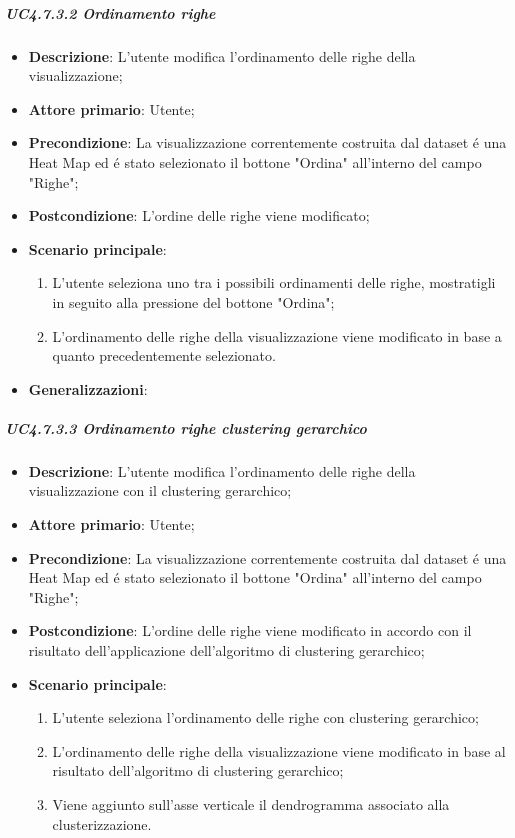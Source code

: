 \subparagraph{UC4.7.3.2 Ordinamento righe}
\label{spar:uc4.7.3.2}
\begin{itemize}
    \item \textbf{Descrizione}:     L'utente modifica l'ordinamento delle righe della visualizzazione;
    \item \textbf{Attore primario}: Utente;
    \item \textbf{Precondizione}:   La visualizzazione correntemente costruita dal dataset é una Heat Map ed é stato selezionato il bottone "Ordina" all'interno del campo "Righe";
    \item \textbf{Postcondizione}:  L'ordine delle righe viene modificato;
    \item \textbf{Scenario principale}:
    \begin{enumerate}
        \item L'utente seleziona uno tra i possibili ordinamenti delle righe, mostratigli in seguito alla pressione del bottone "Ordina";
        \item L'ordinamento delle righe della visualizzazione viene modificato in base a quanto precedentemente selezionato.
    \end{enumerate}
    \item \textbf{Generalizzazioni}:
\end{itemize}

\subparagraph{UC4.7.3.3 Ordinamento righe clustering gerarchico}
\label{spar:uc4.7.3.3}
\begin{itemize}
    \item \textbf{Descrizione}:     L'utente modifica l'ordinamento delle righe della visualizzazione con il clustering gerarchico;
    \item \textbf{Attore primario}: Utente;
    \item \textbf{Precondizione}:   La visualizzazione correntemente costruita dal dataset é una Heat Map ed é stato selezionato il bottone "Ordina" all'interno del campo "Righe";
    \item \textbf{Postcondizione}:  L'ordine delle righe viene modificato in accordo con il risultato dell'applicazione dell'algoritmo di clustering gerarchico;
    \item \textbf{Scenario principale}:
    \begin{enumerate}
        \item L'utente seleziona l'ordinamento delle righe con clustering gerarchico;
        \item L'ordinamento delle righe della visualizzazione viene modificato in base al risultato dell'algoritmo di clustering gerarchico;
        \item Viene aggiunto sull'asse verticale il dendrogramma associato alla clusterizzazione.
    \end{enumerate}
\end{itemize}

